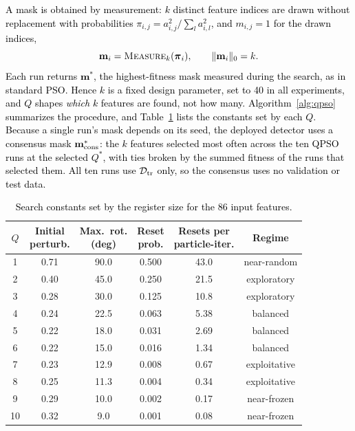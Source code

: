 \documentclass[conference]{IEEEtran}
\begin{document}
\textcolor{black}{A mask is obtained by measurement: $k$
distinct feature indices are drawn without replacement with
probabilities $\pi_{i,j}=a_{i,j}^{2}/\sum_{l}a_{i,l}^{2}$, and
$m_{i,j}=1$ for the drawn indices,}
\begin{equation}
\textcolor{black}{\mathbf{m}_i = \textsc{Measure}_k(\boldsymbol{\pi}_i),
\qquad \|\mathbf{m}_i\|_0 = k .}
\label{eq:qpso_measure}
\end{equation}
\textcolor{black}{Each run returns $\mathbf{m}^{*}$, the
highest-fitness mask measured during the search, as in standard PSO.
Hence $k$ is a fixed design parameter, set to 40 in all experiments,
and $Q$ shapes \emph{which} $k$ features are found, not how many.
Algorithm~\ref{alg:qpso} summarizes the procedure, and
Table~\ref{tab:q_constants} lists the constants set by each $Q$.}
\textcolor{black}{Because a single run's mask depends on its
seed, the deployed detector uses a consensus mask
$\mathbf{m}^{*}_{\rm cons}$: the $k$ features selected most often
across the ten QPSO runs at the selected $Q^{*}$, with ties broken by
the summed fitness of the runs that selected them. All ten runs use
$\mathcal{D}_{\rm tr}$ only, so the consensus uses no validation or
test data.}

\begin{table}[!t]
\centering
\scriptsize
\caption{\textcolor{black}{Search constants set by the
register size for the 86 input features.}}
\label{tab:q_constants}
\setlength{\tabcolsep}{4pt}
\renewcommand{\arraystretch}{1.05}
\begin{tabular}{cccccc}
\hline\toprule
$Q$ & \makecell{Initial\\perturb.} & \makecell{Max.\ rot.\\(deg)} & \makecell{Reset\\prob.} & \makecell{Resets per\\particle-iter.} & Regime \\
\hline\toprule
1  & 0.71 & 90.0 & 0.500  & 43.0 & near-random \\
2  & 0.40 & 45.0 & 0.250  & 21.5 & exploratory \\
3  & 0.28 & 30.0 & 0.125  & 10.8 & exploratory \\
4  & 0.24 & 22.5 & 0.063  & 5.38 & balanced \\
5  & 0.22 & 18.0 & 0.031  & 2.69 & balanced \\
6  & 0.22 & 15.0 & 0.016  & 1.34 & balanced \\
7  & 0.23 & 12.9 & 0.008  & 0.67 & exploitative \\
8  & 0.25 & 11.3 & 0.004  & 0.34 & exploitative \\
9  & 0.29 & 10.0 & 0.002  & 0.17 & near-frozen \\
10 & 0.32 & 9.0  & 0.001  & 0.08 & near-frozen \\
\hline\toprule
\end{tabular}
\end{table}
\end{document}
